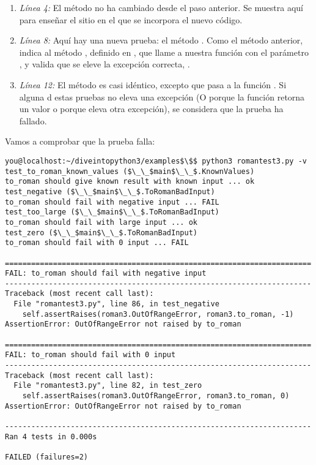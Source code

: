 \begin{enumerate}

\item \emph{Línea 4:} El método  no ha cambiado desde el paso anterior. Se muestra aquí para enseñar el sitio en el que se incorpora el nuevo código.

\item \emph{Línea 8:} Aquí hay una nueva prueba: el método . Como el método anterior, indica al método , definido en , que llame a nuestra función  con el parámetro , y valida que se eleve la excepción correcta, .

\item \emph{Línea 12:} El método  es casi idéntico, excepto que pasa  a la función . Si alguna d estas pruebas no eleva una excepción  (O porque la función retorna un valor o porque eleva otra excepción), se considera que la prueba ha fallado.

\end{enumerate}

Vamos a comprobar que la prueba falla:

\noindent\begin{minipage}{\textwidth}
\begin{lstlisting}[mathescape=True]
you@localhost:~/diveintopython3/examples$\$$ python3 romantest3.py -v
test_to_roman_known_values ($\_\_$main$\_\_$.KnownValues)
to_roman should give known result with known input ... ok
test_negative ($\_\_$main$\_\_$.ToRomanBadInput)
to_roman should fail with negative input ... FAIL
test_too_large ($\_\_$main$\_\_$.ToRomanBadInput)
to_roman should fail with large input ... ok
test_zero ($\_\_$main$\_\_$.ToRomanBadInput)
to_roman should fail with 0 input ... FAIL

======================================================================
FAIL: to_roman should fail with negative input
----------------------------------------------------------------------
Traceback (most recent call last):
  File "romantest3.py", line 86, in test_negative
    self.assertRaises(roman3.OutOfRangeError, roman3.to_roman, -1)
AssertionError: OutOfRangeError not raised by to_roman

======================================================================
FAIL: to_roman should fail with 0 input
----------------------------------------------------------------------
Traceback (most recent call last):
  File "romantest3.py", line 82, in test_zero
    self.assertRaises(roman3.OutOfRangeError, roman3.to_roman, 0)
AssertionError: OutOfRangeError not raised by to_roman

----------------------------------------------------------------------
Ran 4 tests in 0.000s

FAILED (failures=2)
\end{lstlisting}
\end{minipage}

